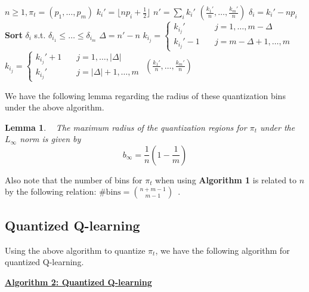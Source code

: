 \documentclass[conference]{IEEEtran}
\newtheorem{lemma}[theorem]{Lemma}
\begin{document}
\begin{algorithmic}[1]
    \REQUIRE \( n\ge1, \pi_t = (p_1, \ldots, p_m) \)
    \STATE \(k_i' = \lfloor np_i + \frac{1}{2} \rfloor\)
    \ENDFOR
    \STATE \(n' = \sum_i k_i'\)
    \RETURN \((\frac{k_1'}{n}, \ldots, \frac{k_m'}{n})\)
    \ENDIF
    \STATE \( \delta_i = k_i' - np_i\)
    \ENDFOR
    \STATE \textbf{Sort} \( \delta_i \) s.t. \( \delta_{i_1} \le \ldots \le \delta_{i_m} \)
    \STATE \( \Delta = n'-n \)
    \STATE \(k_{i_j} = \begin{cases}
        k_{i_j}' \quad   & j = 1,\ldots,m-\Delta   \\
        k_{i_j}'-1 \quad & j = m-\Delta+1,\ldots,m
    \end{cases}\)
    \ELSE
    \STATE \(k_{i_j} = \begin{cases} k_{i_j}'+1 \quad & j = 1,\ldots,|\Delta| \\ k_{i_j}' \quad   & j = |\Delta|+1,\ldots,m \end{cases}\)
    \ENDIF
    \RETURN \((\frac{k_1'}{n}, \ldots, \frac{k_m'}{n}) \)
\end{algorithmic}

We have the following lemma regarding the radius of these quantization bins under the above algorithm.

\begin{lemma}\label{lemma:radius}~\cite[Proposition 2]{Reznik}
    The maximum radius of the quantization regions for \(\pi_t\) under the \( L_{\infty} \) norm is given by
    \[ b_{\infty} = \frac{1}{n}(1-\frac{1}{m}) \]
\end{lemma}

Also note that the number of bins for \( \pi_t \) when using \textbf{Algorithm 1} is related to \( n \) by the following relation: \( \text{\# bins} = {{n+m-1} \choose {m-1}} \)~\cite{Reznik}.

\subsection{Quantized Q-learning}\label{algorithm2}
Using the above algorithm to quantize \( \pi_t \), we have the following algorithm for quantized Q-learning.
\newpage

\vspace{1em}

\noindent \underline{\textbf{Algorithm 2: Quantized Q-learning}}
\end{document}
